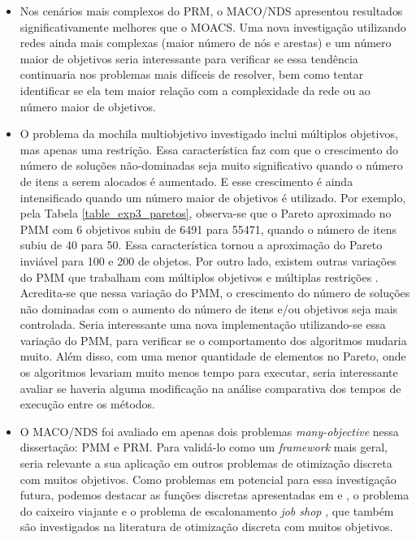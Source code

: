 \begin{itemize}
	\item Nos cenários mais complexos do PRM, o MACO/NDS apresentou resultados significativamente melhores que o MOACS. Uma nova investigação utilizando redes ainda mais complexas (maior número de nós e arestas) e um número maior de objetivos seria interessante para verificar se essa tendência continuaria nos problemas mais difíceis de resolver, bem como tentar identificar se ela tem maior relação com a complexidade da rede ou ao número maior de objetivos.

	\item O problema da mochila multiobjetivo investigado inclui múltiplos objetivos, mas apenas uma restrição. Essa característica faz com que o crescimento do número de soluções não-dominadas seja muito significativo quando o número de itens a serem alocados é aumentado. E esse crescimento é ainda intensificado quando um número maior de objetivos é utilizado. Por exemplo, pela Tabela \ref{table_exp3_paretos}, observa-se  que o Pareto aproximado no PMM com 6 objetivos subiu de 6491 para 55471, quando o número de itens subiu de 40 para 50. Essa característica tornou a aproximação do Pareto inviável para 100 e 200 de objetos. Por outro lado, existem outras variações do PMM que trabalham com múltiplos objetivos e múltiplas restrições \cite{Ishibuchi2015,Alaya2007}. Acredita-se que nessa variação do PMM, o crescimento do número de soluções não dominadas com o aumento do número de itens e/ou objetivos seja mais controlada. Seria interessante uma nova implementação utilizando-se essa variação do PMM, para verificar se o comportamento dos algoritmos mudaria muito. Além disso, com uma menor quantidade de elementos no Pareto, onde os algoritmos levariam muito menos tempo para executar, seria interessante avaliar se haveria alguma modificação na análise comparativa dos tempos de execução entre os métodos.
	
	\item O MACO/NDS foi avaliado em apenas dois problemas \textit{many-objective} nessa dissertação: PMM e PRM. Para validá-lo como um \textit{framework} mais geral, seria relevante a sua aplicação em outros problemas de otimização discreta com muitos objetivos. Como problemas em potencial para essa investigação futura, podemos destacar as funções discretas apresentadas em \cite{DiscreteFunctions1} e  \cite{DiscreteFunctions2}, o problema do caixeiro viajante \cite{Riveros2016} e o problema de escalonamento \textit{job shop} \cite{JobShop}, que também são investigados na literatura de otimização discreta com muitos objetivos.
	

\end{itemize}

